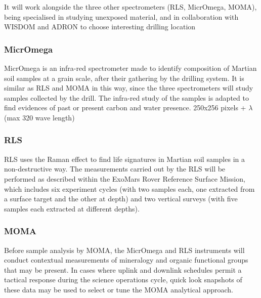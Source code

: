 \documentclass[12pt,a4paper]{article}
\begin{document}
It will work alongside the three other spectrometers (RLS, MicrOmega, MOMA), being specialised in studying unexposed material, and in collaboration with WISDOM and ADRON to choose interesting drilling location

\subsubsection{MicrOmega}

MicrOmega is an infra-red spectrometer made to identify composition of Martian soil samples at a grain scale, after their gathering by the drilling system. It is similar as RLS and MOMA in this way, since the three spectrometers will study samples collected by the drill. The infra-red study of the samples is adapted to find evidences of past or present carbon and water presence. 
250x256 pixels + $\lambda$ (max 320 wave length)

\subsubsection{RLS}
RLS uses the Raman effect to find life signatures in Martian soil samples in a non-destructive way.
The measurements carried out by the RLS will be performed as described within the ExoMars Rover Reference Surface Mission, which includes six experiment cycles (with two samples each, one extracted from a surface target and the other at depth) and two vertical surveys (with five samples each extracted at different depths).
\subsubsection{MOMA}
Before sample analysis by MOMA, the MicrOmega and RLS instruments will conduct contextual measurements of mineralogy and organic functional groups that may be present. In cases where uplink and downlink schedules permit a tactical response during the science operations cycle, quick look snapshots of these data may be used to select or tune the MOMA analytical approach.


\pagebreak
\nocite{*}


\end{document}
